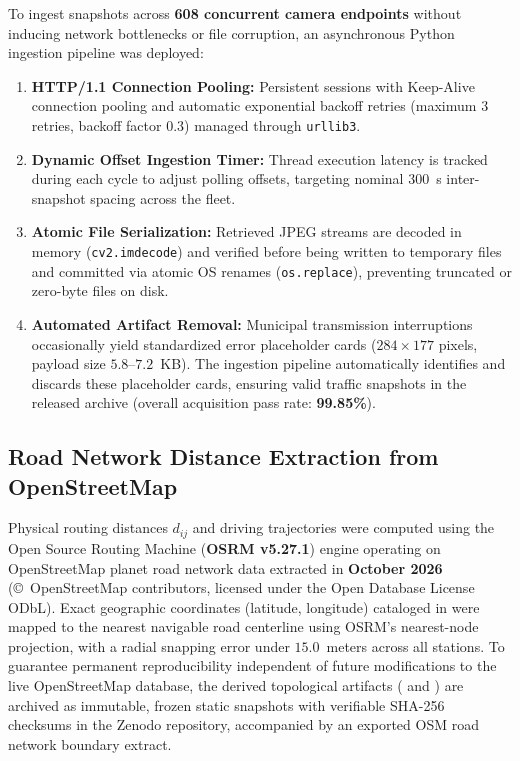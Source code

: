 \documentclass[preprint,12pt]{elsarticle}
\begin{document}
To ingest snapshots across \textbf{608 concurrent camera endpoints} without inducing network bottlenecks or file corruption, an asynchronous Python ingestion pipeline was deployed:
\begin{enumerate}
    \item \textbf{HTTP/1.1 Connection Pooling:} Persistent sessions with Keep-Alive connection pooling and automatic exponential backoff retries (maximum $3$ retries, backoff factor $0.3$) managed through \texttt{urllib3}.
    \item \textbf{Dynamic Offset Ingestion Timer:} Thread execution latency is tracked during each cycle to adjust polling offsets, targeting nominal $300$~s inter-snapshot spacing across the fleet.
    \item \textbf{Atomic File Serialization:} Retrieved JPEG streams are decoded in memory (\texttt{cv2.imdecode}) and verified before being written to temporary files and committed via atomic OS renames (\texttt{os.replace}), preventing truncated or zero-byte files on disk.
    \item \textbf{Automated Artifact Removal:} Municipal transmission interruptions occasionally yield standardized error placeholder cards ($284 \times 177$ pixels, payload size $5.8$--$7.2$~KB). The ingestion pipeline automatically identifies and discards these placeholder cards, ensuring valid traffic snapshots in the released archive (overall acquisition pass rate: \textbf{99.85\%}).
\end{enumerate}

\subsection{Road Network Distance Extraction from OpenStreetMap}
Physical routing distances $d_{ij}$ and driving trajectories were computed using the Open Source Routing Machine (\textbf{OSRM v5.27.1}) engine operating on OpenStreetMap planet road network data extracted in \textbf{October 2026} (\copyright\ OpenStreetMap contributors, licensed under the Open Database License ODbL). Exact geographic coordinates (latitude, longitude) cataloged in  were mapped to the nearest navigable road centerline using OSRM's nearest-node projection, with a radial snapping error under $15.0$~meters across all stations. To guarantee permanent reproducibility independent of future modifications to the live OpenStreetMap database, the derived topological artifacts ( and ) are archived as immutable, frozen static snapshots with verifiable SHA-256 checksums in the Zenodo repository, accompanied by an exported OSM road network boundary extract.
\end{document}
